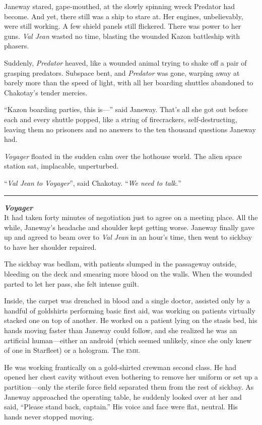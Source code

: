 \documentclass[twoside,letterpaper,12pt]{memoir}
\begin{document}
Janeway stared, gape-mouthed, at the slowly spinning wreck Predator had become. And yet, there still was a ship to stare at. Her engines, unbelievably, were still working. A few shield panels still flickered. There was power to her guns. \textit{Val Jean} wasted no time, blasting the wounded Kazon battleship with phasers.

Suddenly, \textit{Predator} heaved, like a wounded animal trying to shake off a pair of grasping predators. Subspace bent, and \textit{Predator} was gone, warping away at barely more than the speed of light, with all her boarding shuttles abandoned to Chakotay's tender mercies.

``Kazon boarding parties, this is---'' said Janeway. That's all she got out before each and every shuttle popped, like a string of firecrackers, self-destructing, leaving them no prisoners and no answers to the ten thousand questions Janeway had.

\textit{Voyager} floated in the sudden calm over the hothouse world. The alien space station sat, implacable, unperturbed.

``\textit{Val Jean} \textit{to} \textit{Voyager}'', said Chakotay. ``\textit{We need to talk.}''

\fancybreak{\rule{3cm}{0.4 pt}}
\noindent\textit{\textbf{Voyager}}\\

It had taken forty minutes of negotiation just to agree on a meeting place. All the while, Janeway's headache and shoulder kept getting worse. Janeway finally gave up and agreed to beam over to \textit{Val Jean} in an hour's time, then went to sickbay to have her shoulder repaired.

The sickbay was bedlam, with patients slumped in the passageway outside, bleeding on the deck and smearing more blood on the walls. When the wounded parted to let her pass, she felt intense guilt.

Inside, the carpet was drenched in blood and a single doctor, assisted only by a handful of goldshirts performing basic first aid, was working on patients virtually stacked one on top of another. He worked on a patient lying on the stasis bed, his hands moving faster than Janeway could follow, and she realized he was an artificial human---either an android (which seemed unlikely, since she only knew of one in Starfleet) or a hologram. The \textsc{emh}.

He was working frantically on a gold-shirted crewman second class. He had opened her chest cavity without even bothering to remove her uniform or set up a partition---only the sterile force field separated them from the rest of sickbay. As Janeway approached the operating table, he suddenly looked over at her and said, ``Please stand back, captain.'' His voice and face were flat, neutral. His hands never stopped moving.
\end{document}
